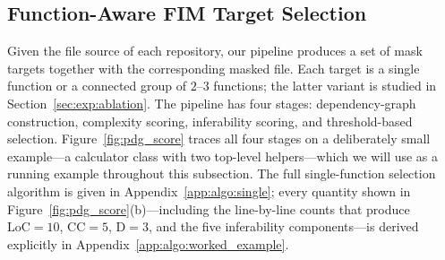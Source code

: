 \subsection{Function-Aware FIM Target Selection}
\label{sec:method:selection}

Given the file source of each repository, our pipeline produces a set of
mask targets together with the corresponding masked file. Each target is
a single function or a connected group of $2$--$3$ functions; the latter
variant is studied in Section~\ref{sec:exp:ablation}. The pipeline has
four stages: dependency-graph construction, complexity scoring,
inferability scoring, and threshold-based selection.
Figure~\ref{fig:pdg_score} traces all four stages on a deliberately
small example---a calculator class with two top-level helpers---which we
will use as a running example throughout this subsection. The full
single-function selection algorithm is given in
Appendix~\ref{app:algo:single}; every quantity shown in
Figure~\ref{fig:pdg_score}(b)---including the line-by-line counts
that produce $\mathrm{LoC}\!=\!10$, $\mathrm{CC}\!=\!5$,
$\mathrm{D}\!=\!3$, and the five inferability components---is derived
explicitly in Appendix~\ref{app:algo:worked_example}.

